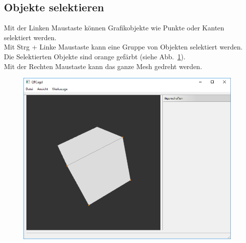 \subsection{Objekte selektieren}
Mit der Linken Maustaste können Grafikobjekte wie Punkte oder Kanten selektiert werden.\\
Mit Strg + Linke Maustaste kann eine Gruppe von Objekten selektiert werden.\\
Die Selektierten Objekte sind orange gefärbt (siehe Abb.~\ref{fig:ObjekteSelektieren}).\\
Mit der Rechten Maustaste kann das ganze Mesh gedreht werden.\\
\begin{figure}[ht!]
	\centering
	\includegraphics[scale=0.6]{content/pictures/3-ObjekteSelektieren}
	\caption{}
	\label{fig:ObjekteSelektieren}
\end{figure}
